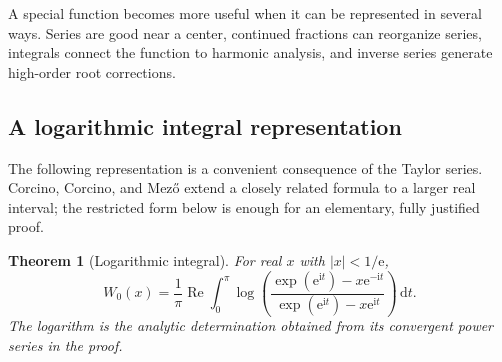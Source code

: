 \documentclass[11pt]{article}
\numberwithin{equation}{section}
\newtheorem{theorem}{Theorem}[section]
\theoremstyle{definition}
\theoremstyle{remark}
\newcommand{\e}{\mathrm e}
\newcommand{\ii}{\mathrm i}
\newcommand{\dd}{\,\mathrm d}
\begin{document}
A special function becomes more useful when it can be represented in several
ways.  Series are good near a center, continued fractions can reorganize
series, integrals connect the function to harmonic analysis, and inverse
series generate high-order root corrections.

\subsection{A logarithmic integral representation}

The following representation is a convenient consequence of the Taylor
series.  Corcino, Corcino, and Mez\H{o} extend a closely related formula to a
larger real interval; the restricted form below is enough for an elementary,
fully justified proof.

\begin{theorem}[Logarithmic integral]
\label{thm:integral-representation}
For real $x$ with $|x|<1/\e$,
\begin{equation}
 W_0(x)=\frac1\pi\operatorname{Re}\int_0^\pi
 \log\!\left(
   \frac{\exp(\e^{\ii t})-x\e^{-\ii t}}
        {\exp(\e^{\ii t})-x\e^{\ii t}}
 \right)\dd t.                                         \label{eq:integral-representation}
\end{equation}
The logarithm is the analytic determination obtained from its convergent
power series in the proof.
\end{theorem}
\end{document}
